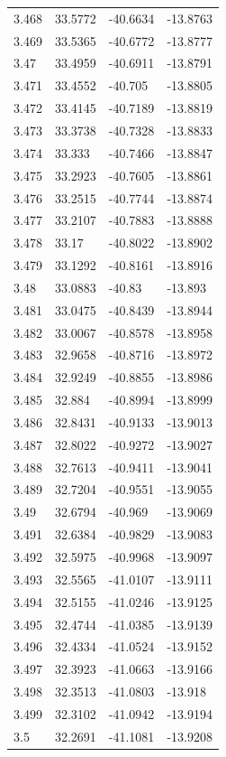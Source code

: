 \begin{tabular}{llll}
3.468 & 33.5772 & -40.6634 & -13.8763 \\
3.469 & 33.5365 & -40.6772 & -13.8777 \\
3.47 & 33.4959 & -40.6911 & -13.8791 \\
3.471 & 33.4552 & -40.705 & -13.8805 \\
3.472 & 33.4145 & -40.7189 & -13.8819 \\
3.473 & 33.3738 & -40.7328 & -13.8833 \\
3.474 & 33.333 & -40.7466 & -13.8847 \\
3.475 & 33.2923 & -40.7605 & -13.8861 \\
3.476 & 33.2515 & -40.7744 & -13.8874 \\
3.477 & 33.2107 & -40.7883 & -13.8888 \\
3.478 & 33.17 & -40.8022 & -13.8902 \\
3.479 & 33.1292 & -40.8161 & -13.8916 \\
3.48 & 33.0883 & -40.83 & -13.893 \\
3.481 & 33.0475 & -40.8439 & -13.8944 \\
3.482 & 33.0067 & -40.8578 & -13.8958 \\
3.483 & 32.9658 & -40.8716 & -13.8972 \\
3.484 & 32.9249 & -40.8855 & -13.8986 \\
3.485 & 32.884 & -40.8994 & -13.8999 \\
3.486 & 32.8431 & -40.9133 & -13.9013 \\
3.487 & 32.8022 & -40.9272 & -13.9027 \\
3.488 & 32.7613 & -40.9411 & -13.9041 \\
3.489 & 32.7204 & -40.9551 & -13.9055 \\
3.49 & 32.6794 & -40.969 & -13.9069 \\
3.491 & 32.6384 & -40.9829 & -13.9083 \\
3.492 & 32.5975 & -40.9968 & -13.9097 \\
3.493 & 32.5565 & -41.0107 & -13.9111 \\
3.494 & 32.5155 & -41.0246 & -13.9125 \\
3.495 & 32.4744 & -41.0385 & -13.9139 \\
3.496 & 32.4334 & -41.0524 & -13.9152 \\
3.497 & 32.3923 & -41.0663 & -13.9166 \\
3.498 & 32.3513 & -41.0803 & -13.918 \\
3.499 & 32.3102 & -41.0942 & -13.9194 \\
3.5 & 32.2691 & -41.1081 & -13.9208 \\

\end{tabular}
